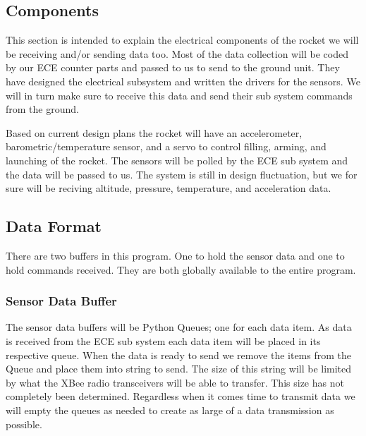 \documentclass[10pt,draftclsnofoot,onecolumn,compsoc]{IEEEtran}
\begin{document}
\subsection{Components} 
This section is intended to explain the electrical components of the rocket we will be receiving and/or sending data too. Most of the data collection will be coded by our ECE counter parts and passed to us to send to the ground unit. They have designed the electrical subsystem and written the drivers for the sensors. We will in turn make sure to receive this data and send their sub system commands from the ground. \par
Based on current design plans the rocket will have an accelerometer, barometric/temperature sensor, and a servo to control filling, arming, and launching of the rocket. The sensors will be polled by the ECE sub system and the data will be passed to us. The system is still in design fluctuation, but we for sure will be reciving altitude, pressure, temperature, and acceleration data.\par

\subsection{Data Format}
There are two buffers in this program. One to hold the sensor data and one to hold commands received. They are both globally available to the entire program.
\subsubsection{Sensor Data Buffer}
The sensor data buffers will be Python Queues; one for each data item. As data is received from the ECE sub system each data item will be placed in its respective queue. When the data is ready to send we remove the items from the Queue and place them into string to send. The size of this string will be limited by what the XBee radio transceivers will be able to transfer. This size has not completely been determined. Regardless when it comes time to transmit data we will empty the queues as needed to create as large of a data transmission as possible.
\end{document}

